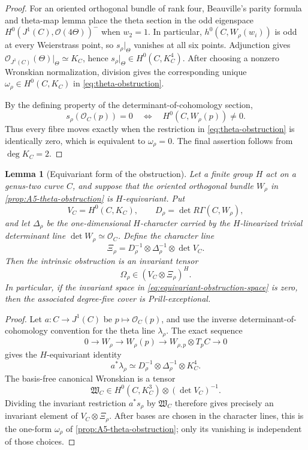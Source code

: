 \documentclass[11pt,reqno]{amsart}
\numberwithin{equation}{section}
\newtheorem{lemma}[lemma]{Lemma}
\theoremstyle{remark}
\newcommand{\cO}{\mathcal O}
\begin{document}
\begin{proof}
For an oriented orthogonal bundle of rank four, Beauville's parity
formula and theta-map lemma \cite[(1.3), Lemma 1.4]{BeauvilleOrthogonal}
place the theta section in the odd eigenspace
\(H^0(J^1(C),\cO(4\Theta))^-\) when \(w_2=1\).  In particular,
\(h^0(C,W_\rho(w_i))\) is odd at every Weierstrass point, so
\(s_\rho|_\Theta\) vanishes at all six points.  Adjunction gives
\(\cO_{J^1(C)}(\Theta)|_\Theta\simeq K_C\), hence
\(s_\rho|_\Theta\in H^0(C,K_C^4)\).  After choosing a nonzero
Wronskian normalization, division gives the corresponding unique
\(\omega_\rho\in H^0(C,K_C)\) in
\eqref{eq:theta-obstruction}.

By the defining property of the determinant-of-cohomology section,
\[
 s_\rho(\cO_C(p))=0
 \quad\Longleftrightarrow\quad
 H^0(C,W_\rho(p))\neq0.
\]
Thus every fibre moves exactly when the
restriction in \eqref{eq:theta-obstruction} is identically zero, which
is equivalent to \(\omega_\rho=0\).  The final assertion follows from
\(\deg K_C=2\).
\end{proof}

\begin{lemma}[Equivariant form of the obstruction]
\label{lem:equivariant-obstruction}
Let a finite group \(H\) act on a genus-two curve \(C\), and suppose
that the oriented orthogonal bundle \(W_\rho\) in
\cref{prop:A5-theta-obstruction} is \(H\)-equivariant.  Put
\[
 V_C=H^0(C,K_C),\qquad
 D_\rho=\det R\Gamma(C,W_\rho),
\]
and let \(\Delta_\rho\) be the one-dimensional \(H\)-character carried
by the \(H\)-linearized trivial determinant line
\(\det W_\rho\simeq\cO_C\).  Define the character line
\[
 \Xi_\rho=
 D_\rho^{-1}\otimes\Delta_\rho^{-1}\otimes\det V_C.
\tag{6.24}\label{eq:Xi-character}
\]
Then the intrinsic obstruction is an invariant tensor
\[
 \Omega_\rho\in(V_C\otimes\Xi_\rho)^H.
\tag{6.25}\label{eq:equivariant-obstruction-space}
\]
In particular, if the invariant space in
\eqref{eq:equivariant-obstruction-space} is zero, then the associated
degree-five cover is Prill-exceptional.
\end{lemma}

\begin{proof}
Let \(a\colon C\to J^1(C)\) be \(p\mapsto\cO_C(p)\), and use the
inverse determinant-of-cohomology convention for the theta line
\(\lambda_\rho\).  The exact sequence
\[
 0\longrightarrow W_\rho\longrightarrow W_\rho(p)
 \longrightarrow W_{\rho,p}\otimes T_pC\longrightarrow0
\]
gives the \(H\)-equivariant identity
\[
 a^*\lambda_\rho\simeq
 D_\rho^{-1}\otimes\Delta_\rho^{-1}\otimes K_C^4.
\tag{6.26}\label{eq:abel-theta-line-equivariant}
\]
The basis-free canonical Wronskian is a tensor
\[
 \mathfrak W_C\in
 H^0(C,K_C^3)\otimes(\det V_C)^{-1}.
\]
Dividing the invariant restriction \(a^*s_\rho\) by
\(\mathfrak W_C\) therefore gives precisely an invariant element of
\(V_C\otimes\Xi_\rho\).  After bases are chosen in the character
lines, this is the one-form \(\omega_\rho\) of
\cref{prop:A5-theta-obstruction}; only its vanishing is independent of
those choices.
\end{proof}
\end{document}
